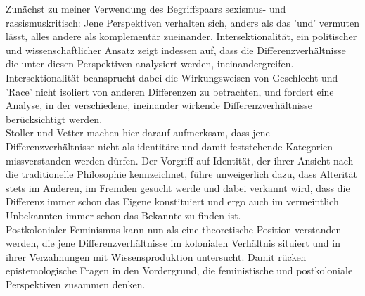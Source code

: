 \noindent Zunächst zu meiner Verwendung des Begriffspaars sexismus- und
rassismuskritisch: Jene Perspektiven verhalten sich, anders als das 'und'
vermuten lässt, alles andere als komplementär zueinander. Intersektionalität,
ein politischer und wissenschaftlicher Ansatz zeigt indessen auf, dass die
Differenzverhältnisse die unter diesen Perspektiven analysiert werden,
ineinandergreifen.\\

\noindent Intersektionalität beansprucht dabei die Wirkungsweisen von Geschlecht und
'Race' nicht isoliert von anderen Differenzen zu betrachten, und fordert eine
Analyse, in der verschiedene, ineinander wirkende Differenzverhältnisse
berücksichtigt werden. \\
Stoller und Vetter machen hier darauf aufmerksam, dass
jene Differenzverhältnisse nicht als identitäre und damit feststehende
Kategorien missverstanden werden dürfen. Der Vorgriff auf Identität, der ihrer
Ansicht nach die traditionelle Philosophie kennzeichnet, führe unweigerlich
dazu, dass Alterität stets im Anderen, im Fremden gesucht werde und dabei
verkannt wird, dass die Differenz immer schon das Eigene konstituiert und ergo
auch im vermeintlich Unbekannten \glqq immer schon das Bekannte zu finden ist.\grqq
\footnotemark {}\\

\noindent Postkolonialer Feminismus kann nun als eine theoretische Position verstanden
werden, die jene Differenzverhältnisse im kolonialen Verhältnis situiert und in
ihrer Verzahnungen mit Wissensproduktion untersucht. Damit rücken
epistemologische Fragen in den Vordergrund, die feministische und postkoloniale
Perspektiven zusammen denken.\\

